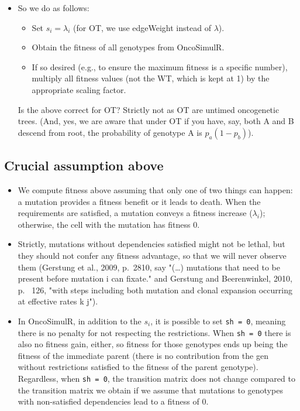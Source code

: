 \documentclass[11pt]{article}
\begin{document}
\begin{itemize}
\item So we do as follows:
\begin{itemize}
\item Set \(s_i = \lambda_i\) (for OT, we use edgeWeight instead of \(\lambda\)).
\item Obtain the fitness of all genotypes from OncoSimulR.
\item If so desired (e.g., to ensure the maximum fitness is a specific number),  multiply all fitness values (not the WT, which is kept at 1) by the appropriate scaling factor.
\end{itemize}

Is the above correct for OT? Strictly not as OT are untimed oncogenetic trees. (And, yes, we are aware that under OT if you have, say, both A and B descend from root, the probability of genotype A is $p_a (1 - p_b)$).
\end{itemize}


\subsection{Crucial assumption above}
\label{sec:org57fee67}
\begin{itemize}
\item We compute fitness above assuming that only one of two things can happen: a mutation provides a fitness benefit or it leads to death. When the requirements are satisfied, a mutation conveys a fitness increase (\(\lambda_i\)); otherwise, the cell with the mutation has fitness 0.

\item Strictly, mutations without dependencies satisfied might not be lethal, but they should not confer any fitness advantage, so that we will never observe them (Gerstung et al., 2009, p.~2810, say "(\ldots{}) mutations that need to be present before mutation i can fixate." and Gerstung and Beerenwinkel, 2010, p.~ 126, "with steps including both mutation and clonal expansion occurring at effective rates k j").

\item In OncoSimulR, in addition to the \(s_i\), it is possible to set \texttt{sh = 0}, meaning there is no penalty for not respecting the restrictions. When \texttt{sh = 0} there is also no fitness gain, either, so fitness for those genotypes ends up being the fitness of the immediate parent (there is no contribution from the gen without restrictions satisfied to the fitness of the parent genotype). Regardless, when \texttt{sh = 0}, the transition matrix does not change compared to the transition matrix we obtain if we assume that mutations to genotypes with non-satisfied dependencies lead to a fitness of 0.
\end{itemize}
\end{document}
